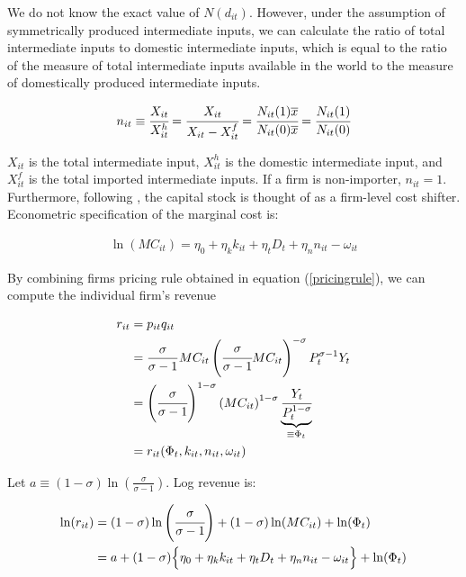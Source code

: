 \documentclass[11pt,letter]{article}
\newcommand{\prn}[1]{\left({#1}\right)}
\newcommand{\Lmprn}[1]{\Big\{{#1}\Big\}}
\newcommand{\cf}[2]{\cfrac{#1}{#2}}
\begin{document}
\begin{appendices}
We do not know the exact value of $N(d_{it})$. However, under the assumption of symmetrically produced intermediate inputs, we can calculate the ratio of total intermediate inputs to domestic intermediate inputs, which is equal to the ratio of the measure of total intermediate inputs available in the world to the measure of domestically produced intermediate inputs.  

\begin{align}
n_{it}\equiv \cfrac{X_{it}}{X_{it}^h} = \cfrac{X_{it}}{X_{it} - X_{it}^f} = \cf{N_{it}(1)\overline{x}}{N_{it}(0)\overline{x}} = \cf{N_{it}(1)}{N_{it}(0)}
\end{align}

\noindent  $X_{it}$ is the total intermediate input, $X_{it}^h$ is the domestic intermediate input, and $X_{it}^f$ is the total imported intermediate inputs. If a firm is non-importer, $n_{it}=1$. Furthermore, following \citet{Bai2017}, the capital stock is thought of as a firm-level cost shifter. Econometric specification of the marginal cost is:

\begin{align}
\ln \prn{MC_{it}} = \eta_0 + \eta_k k_{it} + \eta_t D_t + \eta_n n_{it} - \omega_{it}
\end{align}

By combining firms pricing rule obtained in equation (\ref{pricingrule}), we can compute the individual firm's revenue

\begin{align}
r_{it} &= p_{it }q_{it}\nonumber \\
&=\frac{\sigma}{\sigma-1}MC_{it} \prn{\cf{\sigma}{\sigma-1}MC_{it}}^{-\sigma}P_t^{\sigma-1}Y_t \nonumber \\
&=\prn{\cf{\sigma}{\sigma-1}}^{1-\sigma}\prn{MC_{it}}^{1-\sigma}\underbrace{\cf{Y_t}{P_t^{1-\sigma}}}_{\equiv \Phi_t} \nonumber \\
&= r_{it}(\Phi_t,k_{it},n_{it},\omega_{it})
\end{align}

\noindent Let $a\equiv (1-\sigma)\ln\prn{\frac{\sigma}{\sigma-1}}$. Log revenue is:

\begin{align}
\ln (r_{it}) &= (1-\sigma)\ln\prn{\cfrac{\sigma}{\sigma-1}} + (1-\sigma)\ln(MC_{it}) + \ln({\Phi_t}) \nonumber \\
&= a + (1-\sigma)\Lmprn{ \eta_0 + \eta_k k_{it} + \eta_t D_t + \eta_n n_{it} - \omega_{it}} + \ln (\Phi_t)
\end{align}



\end{appendices}
\end{document}
